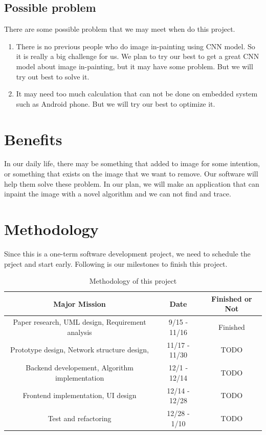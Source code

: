 \documentclass[12pt]{article}
\begin{document}
\subsection{Possible problem}
There are some possible problem that we may meet when do this project.
\begin{enumerate}[1.]
	\item There is no previous people who do image in-painting using CNN model. So it is really a big challenge for us. We plan to try our best to get a great CNN model about image in-painting, but it may have some problem. But we will try out best to solve it.
	\item It may need too much calculation that can not be done on embedded system such as Android phone. But we will try our best to optimize it. 
\end{enumerate}





\section{Benefits}
\qquad In our daily life, there may be something that added to image for some intention, or something that exists on the image that we want to remove. Our software will help them solve these problem. In our plan, we will make an application that can inpaint the image with a novel algorithm and we can not find and trace. 
\section{Methodology}
Since this is a one-term software development project, we need to schedule the prject and start early. Following is our milestones to finish this project.
\begin{table}[H]
	\hspace{-1cm}
	\begin{tabular}{|c|c|c|}
		\hline
		Major Mission & Date & Finished or Not \\
		\hline
		Paper research, UML design, Requirement analysis
		& 9/15 - 11/16& Finished \\
		\hline
		 Prototype design, Network structure design, 
		 & 11/17 - 11/30 & TODO \\
		\hline
		 Backend developement, Algorithm implementation & 12/1 - 12/14 & TODO\\
		\hline
		 Frontend implementation, UI design & 12/14 - 12/28 & TODO\\
		\hline
		 Test and refactoring & 12/28 - 1/10 & TODO\\
		\hline 
	\end{tabular}
	\caption{Methodology of this project}
\end{table}
\end{document}

